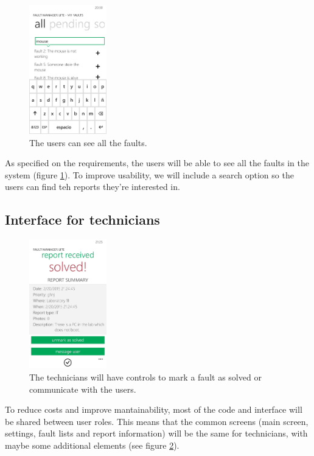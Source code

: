 \documentclass{report}
\begin{document}
\begin{figure}[hbtp]
\centering
\includegraphics[width=0.3\textwidth]{img/AllFaults.jpg}
\caption{The users can see all the faults.}
\label{imgAllFaults}
\end{figure}

As specified on the requirements, the users will be able to see all the faults in the system (figure \ref{imgAllFaults}). To improve usability, we will include a search option so the users can find teh reports they're interested in.

\subsection{Interface for technicians}

\begin{figure}[hbtp]
\centering
\includegraphics[width=0.3\textwidth]{img/SolvedFault.jpg}
\caption{The technicians will have controls to mark a fault as solved or communicate with the users.}
\label{imgSolvedFault}
\end{figure}

To reduce costs and improve mantainability, most of the code and interface will be shared between user roles. This means that the common screens (main screen, settings, fault lists and report information) will be the same for technicians, with maybe some additional elements (see figure \ref{imgSolvedFault}).
\end{document}
